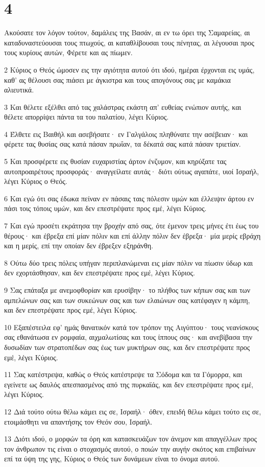 \chapter{4}

\par Ακούσατε τον λόγον τούτον, δαμάλεις της Βασάν, αι εν τω όρει της Σαμαρείας, αι καταδυναστεύουσαι τους πτωχούς, αι καταθλίβουσαι τους πένητας, αι λέγουσαι προς τους κυρίους αυτών, Φέρετε και ας πίωμεν.
\par 2 Κύριος ο Θεός ώμοσεν εις την αγιότητα αυτού ότι ιδού, ημέραι έρχονται εις υμάς, καθ' ας θέλουσι σας πιάσει με άγκιστρα και τους απογόνους σας με καμάκια αλιευτικά.
\par 3 Και θέλετε εξέλθει από τας χαλάστρας εκάστη απ' ευθείας ενώπιον αυτής, και θέλετε απορρίψει πάντα τα του παλατίου, λέγει Κύριος.
\par 4 Έλθετε εις Βαιθήλ και ασεβήσατε· εν Γαλγάλοις πληθύνατε την ασέβειαν· και φέρετε τας θυσίας σας κατά πάσαν πρωΐαν, τα δέκατά σας κατά πάσαν τριετίαν.
\par 5 Και προσφέρετε εις θυσίαν ευχαριστίας άρτον ένζυμον, και κηρύξατε τας αυτοπροαιρέτους προσφοράς· αναγγείλατε αυτάς· διότι ούτως αγαπάτε, υιοί Ισραήλ, λέγει Κύριος ο Θεός.
\par 6 Και εγώ ότι σας έδωκα πείναν εν πάσαις ταις πόλεσιν υμών και έλλειψιν άρτου εν πάσι τοις τόποις υμών, και δεν επεστρέψατε προς εμέ, λέγει Κύριος.
\par 7 Και εγώ προσέτι εκράτησα την βροχήν από σας, ότε έμενον τρεις μήνες έτι έως του θέρους· και έβρεξα επί μίαν πόλιν και επί άλλην πόλιν δεν έβρεξα· μία μερίς εβράχη και η μερίς, επί την οποίαν δεν έβρεξεν εξηράνθη.
\par 8 Ούτω δύο τρεις πόλεις υπήγαν περιπλανώμεναι εις μίαν πόλιν να πίωσιν ύδωρ και δεν εχορτάσθησαν, και δεν επεστρέψατε προς εμέ, λέγει Κύριος.
\par 9 Σας επάταξα με ανεμοφθορίαν και ερυσίβην· το πλήθος των κήπων σας και των αμπελώνων σας και των συκεώνων σας και των ελαιώνων σας κατέφαγεν η κάμπη, και δεν επεστρέψατε προς εμέ, λέγει Κύριος.
\par 10 Εξαπέστειλα εφ' ημάς θανατικόν κατά τον τρόπον της Αιγύπτου· τους νεανίσκους σας εθανάτωσα εν ρομφαία, αιχμαλωτίσας και τους ίππους σας· και ανεβίβασα την δυσωδίαν των στρατοπέδων σας έως των μυκτήρων σας, και δεν επεστρέψατε προς εμέ, λέγει Κύριος.
\par 11 Σας κατέστρεψα, καθώς ο Θεός κατέστρεψε τα Σόδομα και τα Γόμορρα, και εγείνετε ως δαυλός απεσπασμένος από της πυρκαϊάς, και δεν επεστρέψατε προς εμέ, λέγει Κύριος.
\par 12 Διά τούτο ούτω θέλω κάμει εις σε, Ισραήλ· όθεν, επειδή θέλω κάμει τούτο εις σε, ετοιμάσθητι να απαντήσης τον Θεόν σου, Ισραήλ.
\par 13 Διότι ιδού, ο μορφών τα όρη και κατασκευάζων τον άνεμον και απαγγέλλων προς τον άνθρωπον τις είναι ο στοχασμός αυτού, ο ποιών την αυγήν σκότος και επιβαίνων επί τα ύψη της γης, Κύριος ο Θεός των δυνάμεων είναι το όνομα αυτού.

